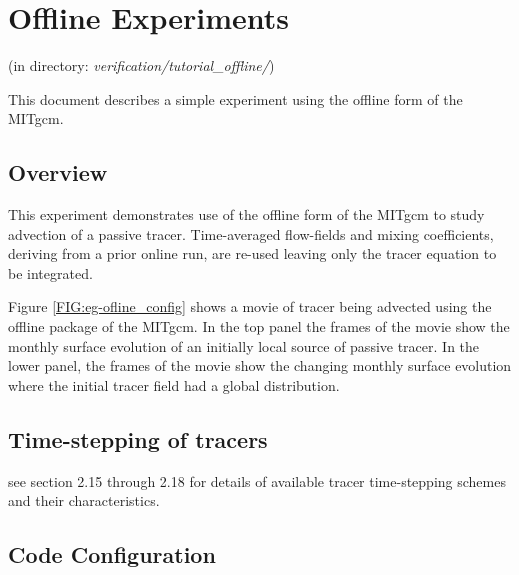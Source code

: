 % 

\section[Offline Example]{Offline Experiments}
\label{www:tutorials}
\label{sect:eg-offline}
\begin{center}
(in directory: {\it verification/tutorial\_offline/})\\
\end{center}

%
%

This document describes a simple experiment using the offline form of
the MITgcm.

\subsection{Overview}
\label{www:tutorials}

This experiment demonstrates use of the offline form of the MITgcm to
study advection of a passive tracer. Time-averaged flow-fields and
mixing coefficients, deriving from a prior online run, are re-used
leaving only the tracer equation to be integrated.

Figure \ref{FIG:eg-ofline_config} shows a movie of tracer being
advected using the offline package of the MITgcm. In the top panel the
frames of the movie show the monthly surface evolution of an initially
local source of passive tracer. In the lower panel, the frames of the
movie show the changing monthly surface evolution where the initial
tracer field had a global distribution.

\subsection{Time-stepping of tracers}
\label{www:tutorials}

\noindent see section 2.15 through 2.18 for details of available
tracer time-stepping schemes and their characteristics.

\subsection{Code Configuration}
\label{www:tutorials}
\label{SEC:eg_offl_code_config}

